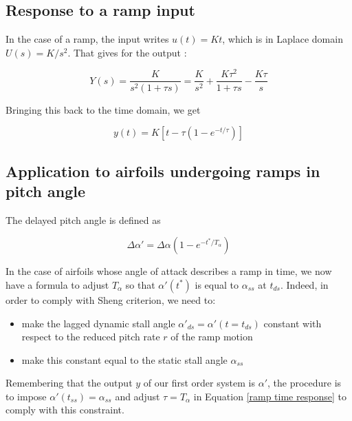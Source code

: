 \documentclass{article}
\begin{document}
\subsection{Response to a ramp input}

In the case of a ramp, the input writes $u(t) = Kt$, which is in Laplace domain $U(s) = K/s^2$. That gives for the output : 

\begin{equation}
Y(s) = \frac{K}{s^2(1+\tau s)} = \frac{K}{s^2} + \frac{K \tau^2}{1+\tau s} - \frac{K \tau}{s}
\end{equation}

Bringing this back to the time domain, we get 

\begin{equation}
y(t) = K \left[ t - \tau(1-e^{-t/\tau})\right]
\label{ramp time response}
\end{equation}

\subsection{Application to airfoils undergoing ramps in pitch angle}

The delayed pitch angle is defined as 

\begin{equation}
\Delta \alpha' = \Delta \alpha (1-e^{-t^*/T_\alpha})
\end{equation}

In the case of airfoils whose angle of attack describes a ramp in time, we now have a formula to adjust $T_\alpha$ so that $\alpha'(t^*)$ is equal to $\alpha_{ss}$ at $t_{ds}$. Indeed, in order to comply with Sheng criterion, we need to:

\begin{itemize}
\item make the lagged dynamic stall angle $\alpha'_{ds} = \alpha'(t=t_{ds})$ constant with respect to the reduced pitch rate $r$ of the ramp motion
\item make this constant equal to the static stall angle $\alpha_{ss}$
\end{itemize}


\noindent Remembering that the output $y$ of our first order system is $\alpha'$, the procedure is to impose $\alpha'(t_{ss}) = \alpha_{ss}$ and adjust $\tau = T_\alpha$ in Equation \eqref{ramp time response} to comply with this constraint.
\end{document}
